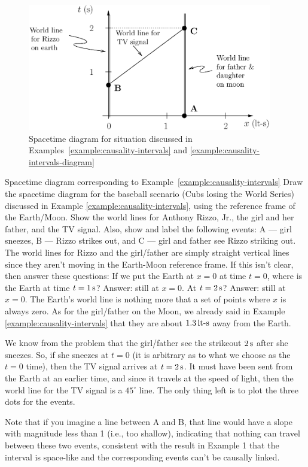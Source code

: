 \begin{figure}[tbp]
\begin{center}
\includegraphics[width=4.2in]{relativistic_spacetime/worldlines2.eps}
\caption{Spacetime diagram for situation discussed in
  Examples~\ref{example:causality-intervals} and
  \ref{example:causality-intervals-diagram}}
\end{center}
\end{figure}

\begin{example}{Spacetime diagram corresponding to 
Example~\ref{example:causality-intervals}} Draw the spacetime diagram
  for the baseball scenario (Cubs losing the World Series) discussed
  in Example \ref{example:causality-intervals}, using the reference
  frame of the Earth/Moon.  Show the world lines for Anthony Rizzo, Jr.,
  the girl and her father, and the TV signal.  Also, show and label
  the following events: A --- girl sneezes, B --- Rizzo strikes out, and
  C --- girl and father see Rizzo striking out.  \solution The world
  lines for Rizzo and the girl/father are simply straight vertical lines
  since they aren't moving in the Earth-Moon reference frame.  If this
  isn't clear, then answer these questions: If we put the Earth at $x
  = 0$ at time $t = 0$, where is the Earth at time $t=1\,\mbox{s}$?
  Answer: still at $x = 0$.  At $t=2\,\mbox{s}$?  Answer: still at $x =
  0$.  The Earth's world line is nothing more that a set of points
  where $x$ is always zero.  As for the girl/father on the Moon, we
  already said in Example \ref{example:causality-intervals} that they
  are about $1.3\,\mbox{lt-s}$ away from the Earth.

We know from the problem that the girl/father see the strikeout
$2\,\mbox{s}$ after she sneezes.  So, if she sneezes at $t = 0$ (it is
arbitrary as to what we choose as the $t = 0$ time), then the TV
signal arrives at $t = 2\,\mbox{s}$.  It must have been sent from the
Earth at an earlier time, and since it travels at the speed of light,
then the world line for the TV signal is a $45^\circ$ line.  The only
thing left is to plot the three dots for the events.

Note that if you imagine a line between A and B, that line would 
have a slope with magnitude less than 1 (i.e., too shallow), 
indicating that nothing can travel between these two events, 
consistent with the result in Example 1 that the interval is space-like 
and the corresponding events can't be causally linked.
\label{example:causality-intervals-diagram}
\end{example}


